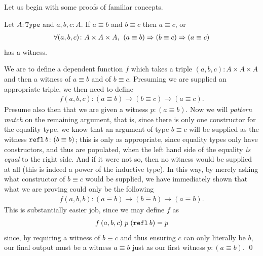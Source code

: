 \documentclass[11pt]{article}
\begin{document}
Let us begin with some proofs of familiar concepts.

\begin{theorem}
Let $A \colon \mathtt{Type}$ and $a, b ,c \colon A$. If $a \equiv b$ and $b \equiv c$ then $a \equiv c$, or \begin{gather*}
\forall (a,b,c) \colon A \times A \times A, \hspace{0.4em} (a \equiv b) \Rightarrow (b \equiv c) \Rightarrow (a \equiv c)
\end{gather*}
has a witness.
\end{theorem}
\begin{my proof}
We are to define a dependent function $f$ which takes a triple $(a,b,c) \colon A \times A \times A$ and then a witness of $a \equiv b$ and of $b \equiv c$. Presuming we are supplied an appropriate triple, we then need to define \begin{gather*}
f(a,b,c) \colon (a \equiv b) \to (b \equiv c) \to (a \equiv c).
\end{gather*}
Presume also then that we are given a witness $p \colon (a \equiv b)$. Now we will \emph{pattern match} on the remaining argument, that is, since there is only one constructor for the equality type, we know that an argument of type $b \equiv c$ will be supplied as the witness $\mathtt{refl} \hspace{0.2em} b \colon (b \equiv b)$; this is only as appropriate, since equality types only have constructors, and thus are populated, when the left hand side of the equality \emph{is equal} to the right side. And if it were not so, then no witness would be supplied at all (this is indeed a power of the inductive type). In this way, by merely asking what constructor of $b \equiv c$ would be supplied, we have immediately shown that what we are proving could only be the following\begin{gather*}
f(a,b,b) \colon (a \equiv b) \to (b \equiv b) \to (a \equiv b).
\end{gather*}
This is substantially easier job, since we may define $f$ as \begin{gather*}
f\hspace{0.2em} (a,b,c) \hspace{0.3em} p \hspace{0.3em} (\mathtt{refl} \hspace{0.2em} b) = p
\end{gather*}
since, by requiring a witness of $b \equiv c$ and thus ensuring $c$ can only literally be $b$, our final output must be a witness $a \equiv b$ just as our first witness $p \colon (a \equiv b)$. \qed
\end{my proof}
\end{document}

